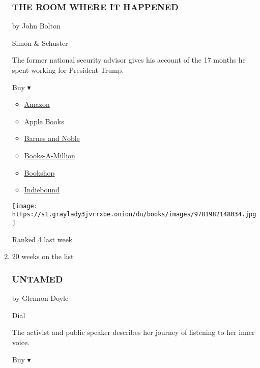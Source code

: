 \begin{enumerate}
  \hypertarget{the-room-where-it-happened}{%
  \subsubsection{THE ROOM WHERE IT
  HAPPENED}\label{the-room-where-it-happened}}

  by John Bolton

  Simon \& Schuster

  The former national security advisor gives his account of the 17
  months he spent working for President Trump.

  Buy ▾

  \begin{itemize}
  \tightlist
  \item
    \href{https://www.amazon.com/dp/1982148039?tag=NYTBSREV-20\&tag=NYTBS-20}{Amazon}
  \item
    \href{https://du-gae-books-dot-nyt-du-prd.appspot.com/buy?title=THE+ROOM+WHERE+IT+HAPPENED\&author=John+Bolton}{Apple
    Books}
  \item
    \href{https://www.anrdoezrs.net/click-7990613-11819508?url=https\%3A\%2F\%2Fwww.barnesandnoble.com\%2Fw\%2F\%3Fean\%3D9781982148034}{Barnes
    and Noble}
  \item
    \href{https://www.anrdoezrs.net/click-7990613-35140?url=https\%3A\%2F\%2Fwww.booksamillion.com\%2Fp\%2FTHE\%2BROOM\%2BWHERE\%2BIT\%2BHAPPENED\%2FJohn\%2BBolton\%2F9781982148034}{Books-A-Million}
  \item
    \href{https://bookshop.org/a/3546/9781982148034}{Bookshop}
  \item
    \href{https://www.indiebound.org/book/9781982148034?aff=NYT}{Indiebound}
  \end{itemize}

  \texttt{[image: https://s1.graylady3jvrrxbe.onion/du/books/images/9781982148034.jpg]}

  Ranked 4 last week
\item
  20 weeks on the list

  \hypertarget{untamed}{%
  \subsubsection{UNTAMED}\label{untamed}}

  by Glennon Doyle

  Dial

  The activist and public speaker describes her journey of listening to
  her inner voice.

  Buy ▾


\end{enumerate}
